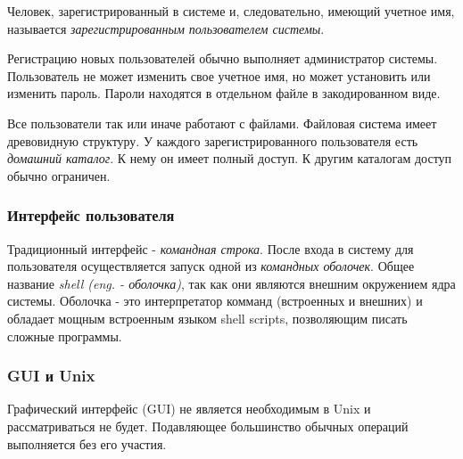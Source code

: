 Человек, зарегистрированный в системе и, следовательно, имеющий учетное имя, называется \emph{зарегистрированным пользователем системы}.

Регистрацию новых пользователей обычно выполняет администратор системы. Пользователь не может изменить свое учетное имя, но может установить или изменить пароль. Пароли находятся в отдельном файле в закодированном виде.

Все пользователи так или иначе работают с файлами. Файловая система имеет древовидную структуру. У каждого зарегистрированного пользователя есть \emph{домашний каталог}. К нему он имеет полный доступ. К другим каталогам доступ обычно ограничен.

\subsubsection{Интерфейс пользователя}

Традиционный интерфейс - \emph{командная строка}. После входа в систему для пользователя осуществляется запуск одной из \emph{командных оболочек}. Общее название \emph{shell (eng. - оболочка)}, так как они являются внешним окружением ядра системы. Оболочка - это интерпретатор комманд (встроенных и внешних) и  обладает мощным встроенным языком shell scripts, позволяющим писать сложные программы. 

\subsubsection{GUI и Unix}

Графический интерфейс (GUI) не является необходимым в Unix и рассматриваться не будет. Подавляющее большинство обычных операций выполняется без его участия.
